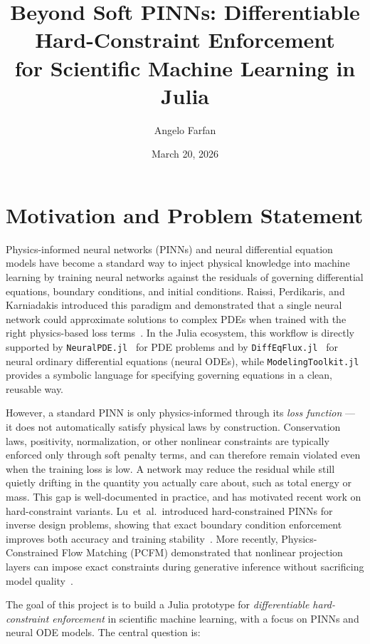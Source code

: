 \documentclass[12pt]{extarticle}
\title{\textbf{Beyond Soft PINNs: Differentiable Hard-Constraint Enforcement\\
for Scientific Machine Learning in Julia}}
\author{Angelo Farfan}
\date{March 20, 2026}
\begin{document}
\maketitle

\section*{Motivation and Problem Statement}

Physics-informed neural networks (PINNs) and neural differential equation
models have become a standard way to inject physical knowledge into machine
learning by training neural networks against the residuals of governing
differential equations, boundary conditions, and initial conditions.
Raissi, Perdikaris, and Karniadakis introduced this paradigm and demonstrated
that a single neural network could approximate solutions to complex PDEs when
trained with the right physics-based loss terms~\cite{raissi2019}.
In the Julia ecosystem, this workflow is directly supported by
\texttt{NeuralPDE.jl}~\cite{zubov2021} for PDE problems and by
\texttt{DiffEqFlux.jl}~\cite{rackauckas2019} for neural ordinary differential
equations (neural ODEs), while \texttt{ModelingToolkit.jl}~\cite{rackauckas2022}
provides a symbolic language for specifying governing equations in a clean,
reusable way.

However, a standard PINN is only physics-informed through its \emph{loss
function} --- it does not automatically satisfy physical laws by
construction. Conservation laws, positivity, normalization, or other nonlinear
constraints are typically enforced only through soft penalty terms, and can
therefore remain violated even when the training loss is low. A network may
reduce the residual while still quietly drifting in the quantity you actually
care about, such as total energy or mass. This gap is well-documented in
practice, and has motivated recent work on hard-constraint variants.
Lu~et~al.\ introduced hard-constrained PINNs for inverse design problems,
showing that exact boundary condition enforcement improves both accuracy and
training stability~\cite{lu2021}. More recently, Physics-Constrained Flow
Matching (PCFM) demonstrated that nonlinear projection layers can impose
exact constraints during generative inference without sacrificing model
quality~\cite{utkarsh2025}.

The goal of this project is to build a Julia prototype for
\emph{differentiable hard-constraint enforcement} in scientific machine
learning, with a focus on PINNs and neural ODE models. The central question is:
\end{document}
